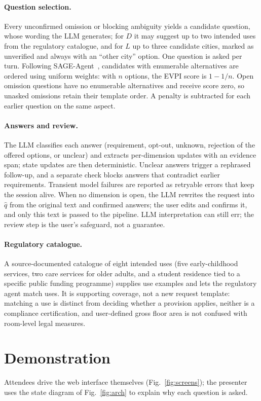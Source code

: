 \documentclass[sigconf,review]{acmart}
\begin{document}
\paragraph{Question selection.} Every unconfirmed omission or blocking
ambiguity yields a candidate question, whose wording the LLM generates;
for $D$ it may suggest up to two intended uses from the regulatory
catalogue, and for $L$ up to three candidate cities, marked as unverified
and always with an ``other city'' option. One question is asked per
turn. Following SAGE-Agent~\cite{suri2026sage}, candidates with
enumerable alternatives are ordered using uniform weights: with $n$
options, the EVPI score is $1-1/n$. Open omission questions have no
enumerable alternatives and receive score zero, so unasked omissions
retain their template order. A penalty is subtracted for each earlier
question on the same aspect.

\paragraph{Answers and review.} The LLM classifies each answer
(requirement, opt-out, unknown, rejection of the offered options, or
unclear) and extracts per-dimension updates with an evidence span; state
updates are then deterministic. Unclear answers trigger a rephrased
follow-up, and a separate check blocks answers that contradict earlier
requirements. Transient model failures are reported as retryable errors
that keep the session alive. When no dimension is open, the LLM rewrites
the request into $\hat q$ from the original text and confirmed answers;
the user edits and confirms it, and only this text is passed to the
pipeline. LLM interpretation can still err; the review step is the
user's safeguard, not a guarantee.

\paragraph{Regulatory catalogue.} A source-documented catalogue of eight
intended uses (five early-childhood services, two care services for
older adults, and a student residence tied to a specific public funding
programme) supplies use examples and lets the regulatory agent match
uses. It is supporting coverage, not a new request template: matching a
use is distinct from deciding whether a provision applies, neither is a
compliance certification, and user-defined gross floor area is not
confused with room-level legal measures.

\section{Demonstration}
\label{sec:demo}
Attendees drive the web interface themselves (Fig.~\ref{fig:screens});
the presenter uses the state diagram of Fig.~\ref{fig:arch} to explain
why each question is asked.
\end{document}
